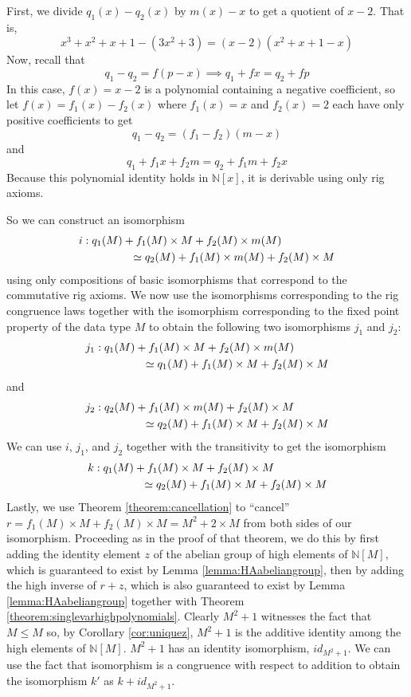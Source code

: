 \documentclass{msthesis}
\theoremstyle{definition}
\newcommand{\nat}{\mathbb{N}}
\begin{document}
First, we divide $q_1(x) - q_2(x)$ by $m(x) - x$ to get a quotient of $x - 2$. That is,
\[ x^3 + x^2 + x + 1 - (3x^2 + 3) = (x - 2)(x^2 + x + 1 - x) \]
Now, recall that
\[ q_1 - q_2 = f(p - x) \implies q_1+fx = q_2 + fp\]
In this case, $f(x) = x - 2$ is a polynomial containing a negative coefficient, so let $f(x) = f_1(x) - f_2(x)$ where $f_1(x) = x$ and $f_2(x) = 2$ each have only positive coefficients to get
\[ q_1 - q_2 = (f_1-f_2)(m - x) \]
and
\[ q_1 + f_1x + f_2m = q_2 + f_1m + f_2x \]
Because this polynomial identity holds in $\nat[x]$, it is derivable using only rig axioms.  

So we can construct an isomorphism 
\begin{align*}
    i &: q_1(M) + f_1(M)\times M + f_2(M)\times m(M)  \\
    &\hspace{1.5cm}\simeq q_2(M) + f_1(M) \times m(M) + f_2(M)\times M
\end{align*}
using only compositions of basic isomorphisms that correspond to the commutative rig axioms.  We now use the isomorphisms corresponding to the rig congruence laws together with the isomorphism corresponding to the fixed point property of the data type $M$ to obtain the following two isomorphisms $j_1$ and $j_2$:
\begin{align*}
    j_1 &: q_1(M) + f_1(M)\times M + f_2(M)\times m(M) \\
    &\hspace{1.5cm}\simeq q_1(M) + f_1(M)\times M + f_2(M)\times M
\end{align*}
and
\begin{align*}
    j_2 &: q_2(M) + f_1(M) \times m(M) + f_2(M)\times M \\
    &\hspace{1.5cm}\simeq q_2(M) + f_1(M) \times M + f_2(M)\times M
\end{align*}
We can use $i$, $j_1$, and $j_2$ together with the transitivity to get the isomorphism
\begin{align*}
    k &: q_1(M) + f_1(M)\times M + f_2(M)\times M \\
    &\hspace{1.5cm}\simeq q_2(M) + f_1(M) \times M + f_2(M)\times M
\end{align*}
Lastly, we use Theorem \ref{theorem:cancellation} to ``cancel'' $r=f_1(M) \times M + f_2(M)\times M = M^2 + 2\times M$ from both sides of our isomorphism.  Proceeding as in the proof of that theorem, we do this by first adding the identity element $z$ of the abelian group of high elements of $\nat[M]$, which is guaranteed to exist by Lemma \ref{lemma:HAabeliangroup}, then by adding the high inverse of $r+z$, which is also guaranteed to exist by Lemma \ref{lemma:HAabeliangroup} together with Theorem \ref{theorem:singlevarhighpolynomials}.  Clearly $M^2 + 1$ witnesses the fact that $M \le M$ so, by Corollary \ref{cor:uniquez}, $M^2 + 1$ is the additive identity among the high elements of $\nat[M]$.  $M^2 + 1$ has an identity isomorphism, $id_{M^2+1}$.  We can use the fact that isomorphism is a congruence with respect to addition to obtain the isomorphism $k'$ as $k + id_{M^2 + 1}$.
\end{document}
